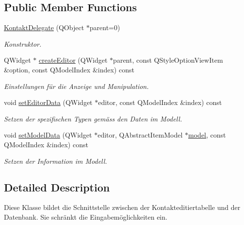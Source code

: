 \subsection*{Public Member Functions}
\begin{CompactItemize}
\item 
\hyperlink{class_kontakt_delegate_b0c6c1d150ba191eeaa0c982ee497b61}{KontaktDelegate} (QObject $\ast$parent=0)
\begin{CompactList}\small\item\em Konstruktor. \item\end{CompactList}\item 
QWidget $\ast$ \hyperlink{class_kontakt_delegate_ba53fe0194a7de1a6d0eb9cb20153ab3}{createEditor} (QWidget $\ast$parent, const QStyleOptionViewItem \&option, const QModelIndex \&index) const 
\begin{CompactList}\small\item\em Einstellungen für die Anzeige und Manipulation. \item\end{CompactList}\item 
void \hyperlink{class_kontakt_delegate_096ab170a084ce50b893f03e0697b0d6}{setEditorData} (QWidget $\ast$editor, const QModelIndex \&index) const 
\begin{CompactList}\small\item\em Setzen der spezifischen Typen gemäss den Daten im Modell. \item\end{CompactList}\item 
void \hyperlink{class_kontakt_delegate_fbf3a18d00f43bb3a9050721bc21426e}{setModelData} (QWidget $\ast$editor, QAbstractItemModel $\ast$\hyperlink{_master_r_d_8h_234be45c406c2d8d2489673913eecfd4}{model}, const QModelIndex \&index) const 
\begin{CompactList}\small\item\em Setzen der Information im Modell. \item\end{CompactList}\end{CompactItemize}


\subsection{Detailed Description}
Diese Klasse bildet die Schnittstelle zwischen der Kontakteditiertabelle und der Datenbank. Sie schränkt die Eingabemöglichkeiten ein. 

